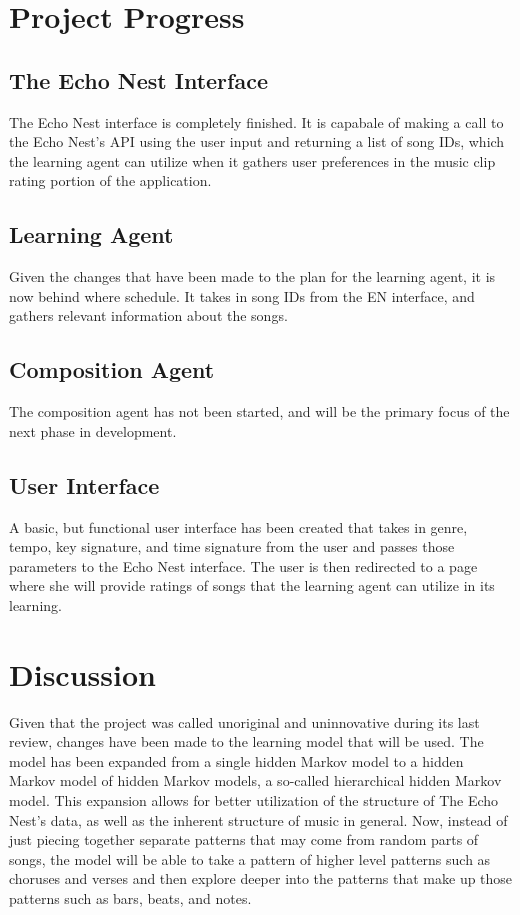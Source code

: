 \documentclass{article}
\begin{document}
\section{Project Progress}
\subsection{The Echo Nest Interface}
The Echo Nest interface is completely finished.  It is capabale of making a call to the Echo Nest's API using the 
user input and returning a list of song IDs, which the learning agent can utilize when it gathers user preferences
in the music clip rating portion of the application.

\subsection{Learning Agent}
Given the changes that have been made to the plan for the learning agent, it is now behind where schedule.
It takes in song IDs from the EN interface, and gathers relevant information about the songs.
\\

\subsection{Composition Agent}
The composition agent has not been started, and will be the primary focus of the next phase in development.

\subsection{User Interface}
A basic, but functional user interface has been created that takes in genre, tempo, key signature, and time
signature from the user and passes those parameters to the Echo Nest interface. The user is then redirected
to a page where she will provide ratings of songs that the learning agent can utilize in its learning.

\section{Discussion}
Given that the project was called unoriginal and uninnovative during its last review, changes have been 
made to the learning model that will be used. The model has been expanded from a single hidden Markov model to 
a hidden Markov model of hidden Markov models, a so-called hierarchical hidden Markov model. This expansion
allows for better utilization of the structure of The Echo Nest's data, as well as the inherent structure of
music in general. Now, instead of just piecing together separate patterns that may come from random parts of
songs, the model will be able to take a pattern of higher level patterns such as choruses and verses and then 
explore deeper into the patterns that make up those patterns such as bars, beats, and notes.
\end{document}

